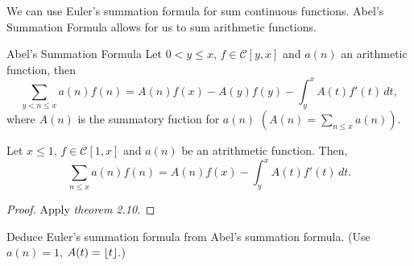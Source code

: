 \documentclass[twoside, openright, fontsize=10pt, headings=big]{scrbook}
\begin{document}
We can use Euler's summation formula for sum continuous functions. Abel's Summation Formula allows for us to sum arithmetic functions.
\begin{theorem}{Abel's Summation Formula}{}
    Let $0<y\leq x$, $f\in\mathcal{C}[y,x]$ and $a(n)$ an arithmetic function, then
    \[
        \sum_{y<n\leq x}a(n)f(n)=A(n)f(x)-A(y)f(y)-\int_{y}^{x}A(t)f'(t)\,dt,
    \]
    where $A(n)$ is the summatory fuction for $a(n)$ $\left(A(n)=\sum_{n\leq x}a(n)\right)$.
\end{theorem}
\begin{corollary}{}{}
    Let $x\leq 1$, $f\in\mathcal{C}[1,x]$ and $a(n)$ be an atrithmetic function. Then,
    \[
        \sum_{n\leq x}a(n)f(n)=A(n)f(x)-\int_{y}^{x}A(t)f'(t)\,dt.
    \]
\end{corollary}
\begin{proof}
    Apply \textit{theorem 2.10}.
\end{proof}
\begin{example}{}{}
    Deduce Euler's summation formula from Abel's summation formula. (Use $a(n)=1$, $A(t)=\left\lfloor t \right\rfloor$.)
\end{example}
\end{document}
